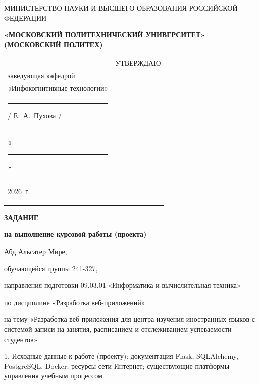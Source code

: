 \documentclass[14pt, a4paper]{extarticle}
\begin{document}
\pagestyle{empty}


\begin{center}
    {\small МИНИСТЕРСТВО НАУКИ И ВЫСШЕГО ОБРАЗОВАНИЯ РОССИЙСКОЙ ФЕДЕРАЦИИ}


    {\small \textbf{«МОСКОВСКИЙ ПОЛИТЕХНИЧЕСКИЙ УНИВЕРСИТЕТ»}} \\
    {\small \textbf{(МОСКОВСКИЙ ПОЛИТЕХ)}}
\end{center}

\begin{tabularx}{\textwidth}{@{} p{} p{} @{}}
     &
    \raggedright
    УТВЕРЖДАЮ                          \\
    заведующая кафедрой                \\
    «Инфокогнитивные технологии»       \\[0.3cm]

    \rule{3cm}{0.4pt} / Е.~А.~Пухова / \\[0.1cm]

    «\rule{0.8cm}{0.4pt}» \rule{3cm}{0.4pt} 2026~г.
\end{tabularx}


\begin{center}

    { \large \textbf{ЗАДАНИЕ}}

    \textbf{на выполнение курсовой работы (проекта)}

    Абд Альсатер Мире,

\end{center}

обучающейся группы 241-327,

направления подготовки 09.03.01 «Информатика и вычислительная техника»

по дисциплине «Разработка веб-приложений»

на тему «Разработка веб-приложения для центра изучения иностранных языков
с системой записи на занятия, расписанием и отслеживанием успеваемости студентов»

1. Исходные данные к работе (проекту): документация Flask, SQLAlchemy, PostgreSQL,
Docker; ресурсы сети Интернет; существующие платформы управления учебным процессом.
\end{document}

